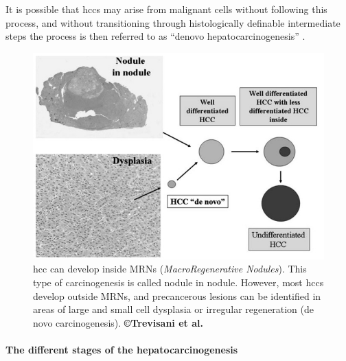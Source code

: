 It is possible that \ac{hcc}s may arise from malignant cells without
following this process, and without transitioning through histologically
definable intermediate steps the process is then referred to as ``denovo
hepatocarcinogenesis'' \cite{Taguchi2002}.


\begin{figure}[th!]
\centering
\includegraphics[width=0.7\linewidth]{images/image3}
\caption{\ac{hcc} can develop inside MRNs (\emph{MacroRegenerative Nodules}). This type of carcinogenesis is called nodule in nodule. However, most \ac{hcc}s develop outside MRNs, and precancerous lesions can be identified in areas of large and small cell dysplasia or irregular regeneration (de novo carcinogenesis). \textbf{©Trevisani et al. \cite{Trevisani2008a}}}
\label{Trevisani2008_Fig2}
\end{figure}

\paragraph{The different stages of the hepatocarcinogenesis}

